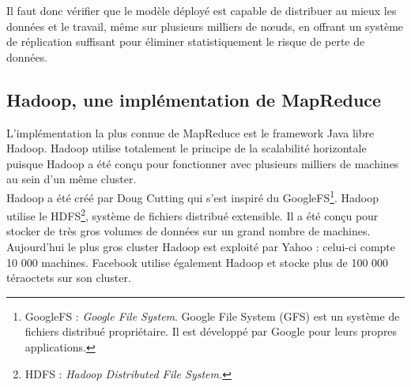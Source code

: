 	Il faut donc vérifier que le modèle déployé est capable de distribuer au mieux les données et le travail, même sur plusieurs milliers de nœuds, en offrant un système de réplication suffisant pour éliminer statistiquement le risque de perte de données.

\subsection{Hadoop, une implémentation de MapReduce}
	L'implémentation la plus connue de MapReduce est le framework Java libre Hadoop. Hadoop utilise totalement le principe de la scalabilité horizontale puisque Hadoop a été conçu pour fonctionner avec plusieurs milliers de machines au sein d'un même cluster.\\

	Hadoop a été créé par Doug Cutting qui s'est inspiré du GoogleFS\footnote{GoogleFS : \textit{Google File System}. Google File System (GFS) est un système de fichiers distribué propriétaire. Il est développé par Google pour leurs propres applications.}. Hadoop utilise le HDFS\footnote{HDFS : \textit{Hadoop Distributed File System.}}, système de fichiers distribué extensible. Il a été conçu pour stocker de très gros volumes de données sur un grand nombre de machines. Aujourd'hui le plus gros cluster Hadoop est exploité par Yahoo : celui-ci compte 10 000 machines.\cite{yahoo_hadoop} Facebook utilise également Hadoop et stocke plus de 100 000 téraoctets sur son cluster.\cite{facebook_hadoop}